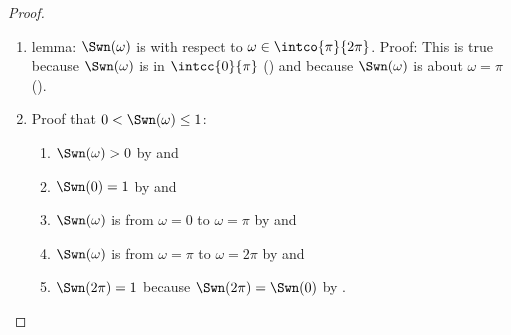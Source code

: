 \begin{proof}
\begin{enumerate}
  \item lemma: $\Swn(\omega)$ is  with respect to $\omega\in\intco{\pi}{2\pi}$. 
        \label{ilem:Nriesz_Gincreasing}
        Proof: This is true because 
               $\Swn(\omega)$ is  in $\intcc{0}{\pi}$ () and 
               because $\Swn(\omega)$ is  about $\omega=\pi$ ().

  \item Proof that $0<\Swn(\omega) \le 1$: \label{item:Nriesz_01}
    \begin{enumerate}
      \item $\Swn(\omega)>0$ by  and
      \item $\Swn(0)=1$ by  and 
      \item $\Swn(\omega)$ is  from $\omega=0$ to $\omega=\pi$ by  and
      \item $\Swn(\omega)$ is  from $\omega=\pi$ to $\omega=2\pi$ by  and
      \item $\Swn(2\pi)=1$ because $\Swn(2\pi)=\Swn(0)$ by .
     \end{enumerate}

\end{enumerate}
\end{proof}

